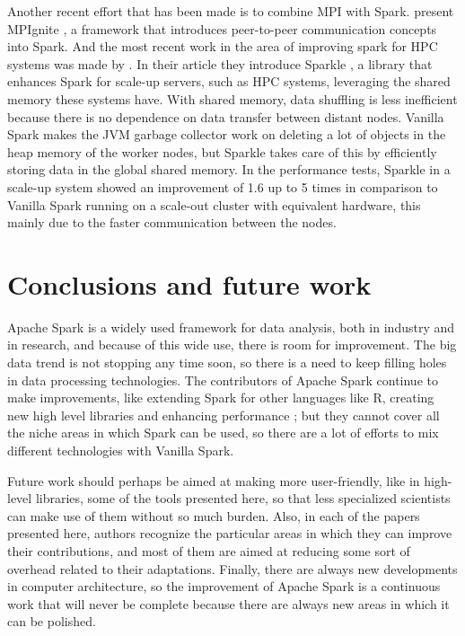 \documentclass{article}
\begin{document}
Another recent effort that has been made is to combine MPI with Spark. \citeauthor{Morris2017} present MPIgnite \cite{Morris2017}, a framework that introduces peer-to-peer communication concepts into Spark. And the most recent work in the area of improving spark for HPC systems was made by \citeauthor{kim2017sparkle}. In their article they introduce Sparkle \cite{kim2017sparkle}, a library that enhances Spark for scale-up servers, such as HPC systems, leveraging the shared memory these systems have. With shared memory, data shuffling is less inefficient because there is no dependence on data transfer between distant nodes. Vanilla Spark makes the JVM garbage collector work on deleting a lot of objects in the heap memory of the worker nodes, but Sparkle takes care of this by efficiently storing data in the global shared memory. In the performance tests, Sparkle in a scale-up system showed an improvement of 1.6 up to 5 times in comparison to Vanilla Spark running on a scale-out cluster with equivalent hardware, this mainly due to the faster communication between the nodes.


\section{Conclusions and future work}
\label{sec:conclusion}

Apache Spark is a widely used framework for data analysis, both in industry and in research, and because of this wide use, there is room for improvement. The big data trend is not stopping any time soon, so there is a need to keep filling holes in data processing technologies. The contributors of Apache Spark continue to make improvements, like extending Spark for other languages like R, creating new high level libraries and enhancing performance \cite{zaharia_apache_2016}; but they cannot cover all the niche areas in which Spark can be used, so there are a lot of efforts to mix different technologies with Vanilla Spark.

Future work should perhaps be aimed at making more user-friendly, like in high-level libraries, some of the tools presented here, so that less specialized scientists can make use of them without so much burden. Also, in each of the papers presented here, authors recognize the particular areas in which they can improve their contributions, and most of them are aimed at reducing some sort of overhead related to their adaptations. Finally, there are always new developments in computer architecture, so the improvement of Apache Spark is a continuous work that will never be complete because there are always new areas in which it can be polished.


\printbibliography
\end{document}

